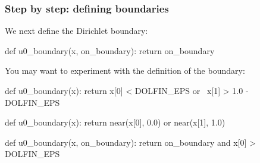 \begin{frame}[fragile]
  \frametitle{Step by step: defining boundaries}

  We next define the Dirichlet boundary:
  \vspace{-0.25cm}
\begin{python}
def u0_boundary(x, on_boundary):
    return on_boundary
\end{python}

  \bigskip

  You may want to experiment with the definition of the boundary:

\begin{python}
def u0_boundary(x):
    return x[0] < DOLFIN_EPS or \
           x[1] > 1.0 - DOLFIN_EPS
\end{python}
\vspace{-0.5cm}
\begin{python}
def u0_boundary(x):
    return near(x[0], 0.0) or near(x[1], 1.0)
\end{python}
\vspace{-0.5cm}
\begin{python}
def u0_boundary(x, on_boundary):
    return on_boundary and x[0] > DOLFIN_EPS
\end{python}

\end{frame}
